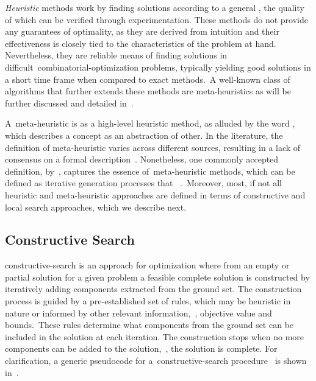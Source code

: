 \emph{Heuristic} methods work by finding solutions according to a general
, the quality of which can be verified through
experimentation. These methods do not provide any guarantees of optimality, as
they are derived from intuition and their effectiveness is closely tied to the
characteristics of the problem at hand. Nevertheless, they are reliable means of
finding solutions in difficult~\acrshort{combinatorial-optimization} problems,
typically yielding good solutions in a short time frame when compared to exact
methods.~A well-known class of algorithms that further extends these methods are
meta-heuristics as will be further discussed and detailed in~.

A~\acrshort{meta-heuristic} is as a high-level heuristic method,
as alluded by the word , which describes a concept as an
abstraction of other. In the literature, the definition of meta-heuristic varies
across different sources, resulting in a lack of consensus on a formal
description~\cite{osman1996metaheuristics,blum2003metaheuristics,festa2014brief,luke2013essentialsa}.
Nonetheless, one commonly accepted definition,
by~\citet{osman1996metaheuristics}, captures the essence
of~\acrshort{meta-heuristic} methods, which can be defined as iterative
generation processes that~\emph{
}.~Moreover, most, if not all heuristic and meta-heuristic approaches are defined
in terms of constructive and local search approaches, which we describe next.

\subsection{Constructive Search}
\label{subsec:contructive-search}

\acrfull{constructive-search} is an approach for optimization where from an
empty or partial solution for a given problem a feasible complete solution is
constructed by iteratively adding components extracted from the ground set. The
construction process is guided by a pre-established set of rules, which may be
heuristic in nature or informed by other relevant information,~\eg{}, objective
value and bounds.~These rules determine what components from the ground set can
be included in the solution at each iteration. The construction stops when no
more components can be added to the solution,~\ie{}, the solution is complete.
For clarification, a generic pseudocode for a~\acrshort{constructive-search}
procedure~\cite{marti2013multistart} is shown in~.

